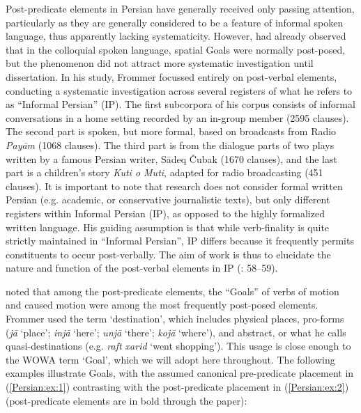 \documentclass[output=paper,colorlinks,citecolor=brown,draftmode]{langscibook}
\begin{document}
Post-predicate elements in Persian have generally received only passing attention, particularly as they are generally considered to be a feature of informal spoken language, thus apparently lacking systematicity. However, \citet[201--205]{Lazard1957Persian} had already observed that in the colloquial spoken language, spatial Goals were normally post-posed, but the phenomenon did not attract more systematic investigation until  dissertation. In his study, Frommer focussed entirely on post-verbal elements, conducting a systematic investigation across several registers of what he refers to as ``Informal Persian'' (IP). The first subcorpora of his corpus consists of informal conversations in a home setting recorded by an in-group member (2595 clauses). The second part is spoken, but more formal, based on broadcasts from Radio \textit{Payām} (1068 clauses). The third part is from the dialogue parts of two plays written by a famous Persian writer, Sādeq Čubak (1670 clauses), and the last part is a children's story \textit{Kuti o Muti}, adapted for radio broadcasting (451 clauses). It is important to note that  research does not consider formal written Persian (e.g. academic, or conservative journalistic texts), but only different registers within Informal Persian (IP), as opposed to the highly formalized written language. His guiding assumption is that while verb-finality is quite strictly maintained in ``Informal Persian'', IP differs because it frequently permits constituents to occur post-verbally. The aim of  work is thus to elucidate the nature and function of the post-verbal elements in IP (\citealt{frommer_post-verbal_1981}: 58--59).

\citet{frommer_post-verbal_1981} noted that among the post-predicate elements, the ``Goals'' of verbs of motion and caused motion were among the most frequently post-posed elements. Frommer used the term `destination', which includes physical places, pro-forms (\textit{jā} `place'; \textit{injā} `here'; \textit{unjā} `there'; \textit{kojā} `where'), and abstract, or what he calls quasi-destinations (e.g. \textit{raft xarid} `went shopping'). This usage is close enough to the WOWA term `Goal', which we will adopt here throughout. The following examples illustrate Goals, with the assumed canonical pre-predicate placement in (\ref{Persian:ex:1}) contrasting with the post-predicate placement in (\ref{Persian:ex:2}) (post-predicate elements are in bold through the paper):
\end{document}
